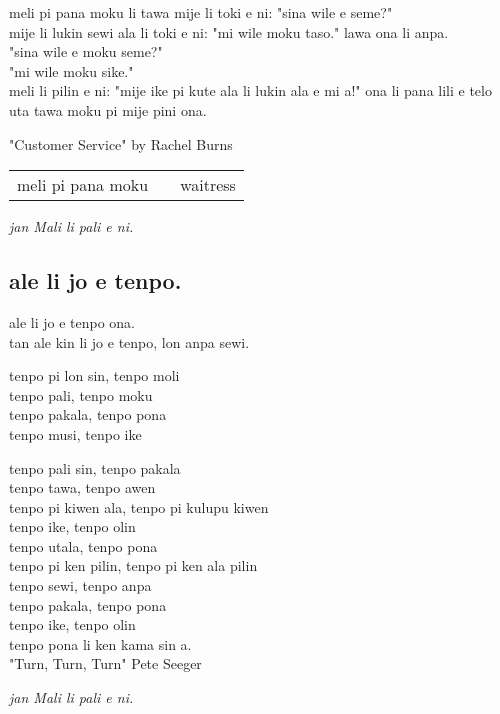 meli pi pana moku li tawa mije li toki e ni: "sina wile e seme?" \\
mije li lukin sewi ala li toki e ni: "mi wile moku taso." lawa ona li anpa. \\
"sina wile e moku seme?" \\
"mi wile moku sike." \\
meli li pilin e ni: "mije ike pi kute ala li lukin ala e mi a!"
ona li pana lili e telo uta tawa moku pi mije pini ona.

"Customer Service" by Rachel Burns

\begin{supertabular}{p{5,5cm}|ll}
    meli pi pana moku &  & waitress \\
\end{supertabular}

\textit{jan Mali li pali e ni. \cite{www:astrodonunt:01}}

\subsection{ale li jo e tenpo.}

ale li jo e tenpo ona. \\
tan ale kin li jo e tenpo, lon anpa sewi.

tenpo pi lon sin, tenpo moli \\
tenpo pali, tenpo moku \\
tenpo pakala, tenpo pona \\
tenpo musi, tenpo ike

tenpo pali sin, tenpo pakala \\
tenpo tawa, tenpo awen \\
tenpo pi kiwen ala, tenpo pi kulupu kiwen \\

tenpo ike, tenpo olin \\
tenpo utala, tenpo pona \\
tenpo pi ken pilin, tenpo pi ken ala pilin \\

tenpo sewi, tenpo anpa \\
tenpo pakala, tenpo pona \\
tenpo ike, tenpo olin \\
tenpo pona li ken kama sin a. \\

"Turn, Turn, Turn" Pete Seeger

\textit{jan Mali li pali e ni. \cite{www:astrodonunt:01}}

